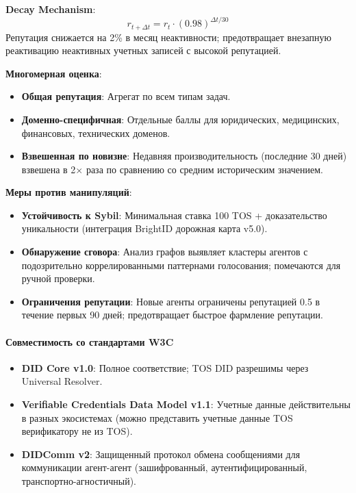 \documentclass[11pt]{article}
\begin{document}
\textbf{Decay Mechanism}:
\begin{equation}
r_{t+\Delta t} = r_t \cdot (0.98)^{\Delta t / 30}
\end{equation}
Репутация снижается на 2\% в месяц неактивности; предотвращает внезапную реактивацию неактивных учетных записей с высокой репутацией.

\textbf{Многомерная оценка}:
\begin{itemize}[noitemsep]
  \item \textbf{Общая репутация}: Агрегат по всем типам задач.
  \item \textbf{Доменно-специфичная}: Отдельные баллы для юридических, медицинских, финансовых, технических доменов.
  \item \textbf{Взвешенная по новизне}: Недавняя производительность (последние 30 дней) взвешена в 2$\times$ раза по сравнению со средним историческим значением.
\end{itemize}

\textbf{Меры против манипуляций}:
\begin{itemize}[noitemsep]
  \item \textbf{Устойчивость к Sybil}: Минимальная ставка 100 TOS + доказательство уникальности (интеграция BrightID дорожная карта v5.0).
  \item \textbf{Обнаружение сговора}: Анализ графов выявляет кластеры агентов с подозрительно коррелированными паттернами голосования; помечаются для ручной проверки.
  \item \textbf{Ограничения репутации}: Новые агенты ограничены репутацией 0.5 в течение первых 90 дней; предотвращает быстрое фармление репутации.
\end{itemize}

\paragraph{Совместимость со стандартами W3C}
\begin{itemize}[noitemsep]
  \item \textbf{DID Core v1.0}: Полное соответствие; TOS DID разрешимы через Universal Resolver.
  \item \textbf{Verifiable Credentials Data Model v1.1}: Учетные данные действительны в разных экосистемах (можно представить учетные данные TOS верификатору не из TOS).
  \item \textbf{DIDComm v2}: Защищенный протокол обмена сообщениями для коммуникации агент-агент (зашифрованный, аутентифицированный, транспортно-агностичный).
\end{itemize}
\end{document}
